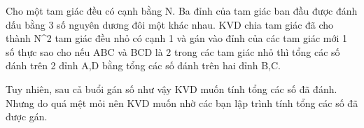 Cho một tam giác đều có cạnh bằng N. Ba đỉnh của tam giác ban đầu được đánh dấu bằng 3 số nguyên dương đôi một khác nhau. KVD chia tam giác đã cho thành N^2 tam giác đều nhỏ có cạnh 1 và gán vào đỉnh của các tam giác mới 1 số thực sao cho nếu ABC và BCD là 2 trong các tam giác nhỏ thì tổng các số đánh trên 2 đỉnh A,D bằng tổng các số đánh trên hai đỉnh B,C.  

   Tuy nhiên, sau cả buổi gán số như vậy KVD muốn tính tổng các số đã đánh. Nhưng do quá mệt mỏi nên KVD muốn nhờ các bạn lập trình tính tổng các số đã được gán.
